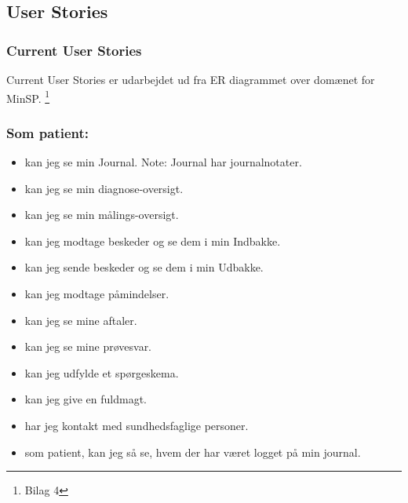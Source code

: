 %
%
%
%
%
%
%
%
%
%
%
%
%
%
%
%
%
%
%
%
%
%
%
%
%
%
\subsection{User Stories}
\subsubsection{Current User Stories} %
Current User Stories er udarbejdet ud fra ER diagrammet over domænet for MinSP. \footnote{Bilag 4} 
\subsubsection*{Som patient:}
\begin{itemize}
\item kan jeg se min Journal. Note: Journal har journalnotater. 
\item kan jeg se min diagnose-oversigt.
\item kan jeg se min målings-oversigt.
\item kan jeg modtage beskeder og se dem i min Indbakke.
\item kan jeg sende beskeder og se dem i min Udbakke.
\item kan jeg modtage påmindelser.
\item kan jeg se mine aftaler. 
\item kan jeg se mine prøvesvar.
\item kan jeg udfylde et spørgeskema.
\item kan jeg give en fuldmagt. 
\item har jeg kontakt med sundhedsfaglige personer. 
\item som patient, kan jeg så se, hvem der har været logget på min journal.
\end{itemize}
